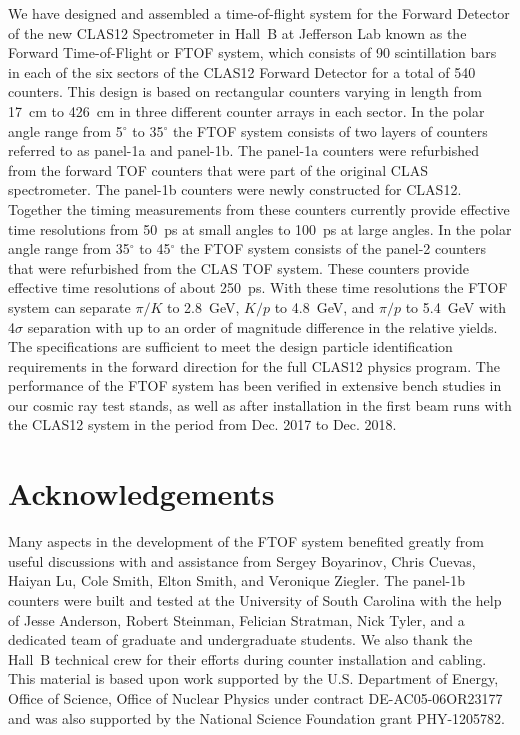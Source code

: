 \documentclass[final,3p,twocolumn]{elsarticle}
\begin{document}
We have designed and assembled a time-of-flight system for the Forward Detector of the new CLAS12
Spectrometer in Hall~B at Jefferson Lab known as the Forward Time-of-Flight or FTOF system, which
consists of 90 scintillation bars in each of the six sectors of the CLAS12 Forward Detector for a total of
540 counters. This design is based on rectangular counters varying in length from 17~cm to 426~cm in
three different counter arrays in each sector. In the polar angle range from 5$^\circ$ to 35$^\circ$ the
FTOF system consists of two layers of counters referred to as panel-1a and panel-1b. The panel-1a counters
were refurbished from the forward TOF counters that were part of the original CLAS spectrometer. The
panel-1b counters were newly constructed for CLAS12. Together the timing measurements from these
counters currently provide effective time resolutions from 50~ps at small angles to 100~ps at large angles.
In the polar angle range from 35$^\circ$ to 45$^\circ$ the FTOF system consists of the panel-2 counters
that were refurbished from the CLAS TOF system. These counters provide effective time resolutions of
about 250~ps. With these time resolutions the FTOF system can separate $\pi/K$ to 2.8~GeV, $K/p$ to
4.8~GeV, and $\pi/p$ to 5.4~GeV with 4$\sigma$ separation with up to an order of magnitude difference
in the relative yields. The specifications are sufficient to meet the design particle identification requirements
in the forward direction for the full CLAS12 physics program. The performance of the FTOF system has been
verified in extensive bench studies in our cosmic ray test stands, as well as after installation in the first beam
runs with the CLAS12 system in the period from Dec. 2017 to Dec. 2018. 

\section*{Acknowledgements}

Many aspects in the development of the FTOF system benefited greatly from useful discussions with and
assistance from Sergey Boyarinov, Chris Cuevas, Haiyan Lu, Cole Smith, Elton Smith, and Veronique Ziegler. The
panel-1b counters were built and tested at the University of South Carolina with the help of Jesse Anderson,
Robert Steinman, Felician Stratman, Nick Tyler, and a dedicated team of graduate and undergraduate students.
We also thank the Hall~B technical crew for their efforts during counter installation and cabling. This material is
based upon work supported by the U.S. Department of Energy, Office of Science, Office of Nuclear Physics under
contract DE-AC05-06OR23177 and was also supported by the National Science Foundation grant PHY-1205782.
\end{document}
